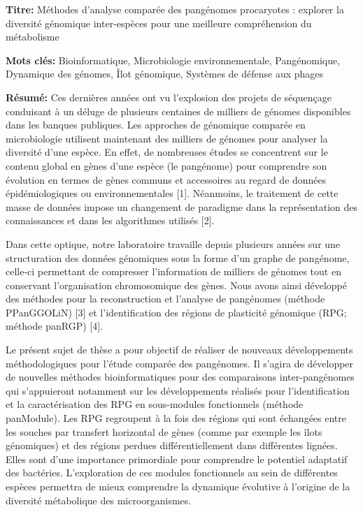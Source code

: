 \begin{mdframed}[linecolor=Prune,linewidth=1]

\textbf{Titre:} Méthodes d’analyse comparée des pangénomes procaryotes : explorer la diversité génomique inter-espèces pour une meilleure  compréhension du métabolisme

\noindent \textbf{Mots clés:} Bioinformatique, Microbiologie environnementale, Pangénomique, Dynamique des génomes, Îlot génomique, Systèmes de défense aux phages

\vspace{-.5cm}
\begin{multicols}{2}
\noindent \textbf{Résumé:} Ces dernières années ont vu l'explosion des projets de séquençage conduisant à un déluge de plusieurs centaines de milliers de génomes disponibles dans les banques publiques. Les approches de génomique comparée en microbiologie utilisent maintenant des milliers de génomes pour analyser la diversité d’une espèce. En effet, de nombreuses études se concentrent sur le contenu global en gènes d'une espèce (le pangénome) pour comprendre son évolution en termes de gènes communs et accessoires au regard de données épidémiologiques ou environnementales [1]. Néanmoins, le traitement de cette masse de données impose un changement de paradigme dans la représentation des connaissances et dans les algorithmes utilisés [2]. 

Dans cette optique, notre laboratoire travaille depuis plusieurs années sur une structuration des données génomiques sous la forme d’un graphe de pangénome, celle-ci permettant de compresser l’information de milliers de génomes tout en conservant l’organisation chromosomique des gènes. Nous avons ainsi développé des méthodes pour la reconstruction et l’analyse de pangénomes (méthode PPanGGOLiN) [3] et l’identification des régions de plasticité génomique (RPG; méthode panRGP) [4]. 

Le présent sujet de thèse a pour objectif de réaliser de nouveaux développements méthodologiques  pour l’étude comparée des pangénomes. Il s’agira de développer de nouvelles méthodes bioinformatiques pour des comparaisons inter-pangénomes qui s’appuieront notamment sur les développements réalisés pour l’identification et la caractérisation des RPG en sous-modules fonctionnels (méthode panModule). Les RPG regroupent à la fois des régions qui sont échangées entre les souches par transfert horizontal de gènes (comme par exemple les îlots génomiques) et des régions perdues différentiellement dans différentes lignées. Elles sont d'une importance primordiale pour comprendre le potentiel adaptatif des bactéries. L’exploration de ces modules fonctionnels au sein de différentes espèces permettra de mieux comprendre la dynamique évolutive à l’origine de la diversité métabolique des microorganismes.


\end{multicols}
\end{mdframed}
